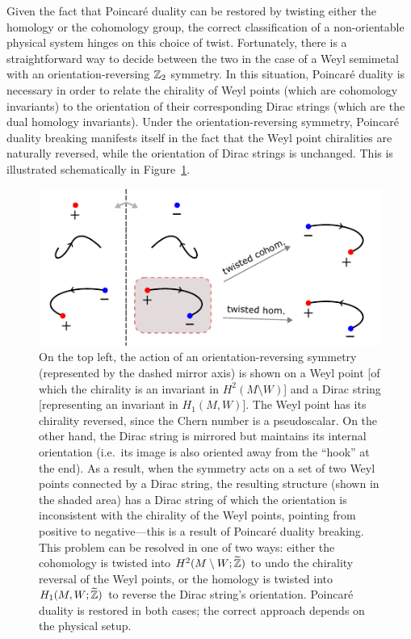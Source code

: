Given the fact that Poincaré duality can be restored by twisting either the homology or the cohomology group, the correct classification of a non-orientable physical system hinges on this choice of twist. Fortunately, there is a straightforward way to decide between the two in the case of a Weyl semimetal with an orientation-reversing $\mathbb{Z}_2$ symmetry. In this situation, Poincaré duality is necessary in order to relate the chirality of Weyl points (which are cohomology invariants) to the orientation of their corresponding Dirac strings (which are the dual homology invariants). Under the orientation-reversing symmetry, Poincaré duality breaking manifests itself in the fact that the Weyl point chiralities are naturally reversed, while the orientation of Dirac strings is unchanged. This is illustrated schematically in Figure~\ref{fig:local_coefficients}.
\begin{figure}[htb!]
	\centering
	\includegraphics[width=.9\linewidth]{Images/local_coefficients}
	\caption{On the top left, the action of an orientation-reversing symmetry (represented by the dashed mirror axis) is shown on a Weyl point [of which the chirality is an invariant in $H^2(M\setminus W)$] and a Dirac string  [representing an invariant in $H_1(M,W)$]. The Weyl point has its chirality reversed, since the Chern number is a pseudoscalar. On the other hand, the Dirac string is mirrored but maintains its internal orientation (i.e.\ its image is also oriented away from the ``hook'' at the end). As a result, when the symmetry acts on a set of two Weyl points connected by a Dirac string, the resulting structure (shown in the shaded area) has a Dirac string of which the orientation is inconsistent with the chirality of the Weyl points, pointing from positive to negative---this is a result of Poincaré duality breaking. This problem can be resolved in one of two ways: either the cohomology is twisted into $H^2(M\setminus W;\widetilde{\mathbb{Z}})$ to undo the chirality reversal of the Weyl points, or the homology is twisted into $H_1(M,W;\widetilde{\mathbb{Z}})$ to reverse the Dirac string's orientation. Poincaré duality is restored in both cases; the correct approach depends on the physical setup.}
	\label{fig:local_coefficients}
\end{figure}
